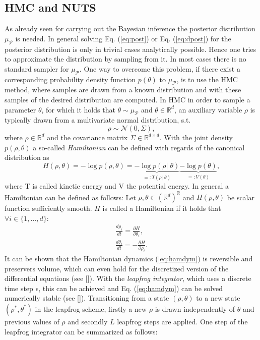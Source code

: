 \documentclass[12pt,letterpaper]{article}
\numberwithin{equation}{subsection}
\begin{document}
\subsection{HMC and NUTS}
As already seen for carrying out the Bayesian inference the posterior distribution $\mu_\mathcal{P}$ is needed. In general solving Eq.  (\ref{eq:post}) or Eq. (\ref{eq:dpost}) for the posterior distribution is only in trivial cases analytically possible. Hence one tries to approximate the distribution by sampling from it. In most cases there is no standard sampler for $\mu_\mathcal{P}$. One way to overcome this problem, if there exist a corresponding probability density function $p(\theta)$ to $\mu_\mathcal{P}$, is to use the HMC method, where samples are drawn from a known distribution and with these samples of the desired distribution are computed. In HMC in order to sample a parameter $\theta$, for which it holds that $\theta \sim \mu_\mathcal{P}$ and $\theta \in \mathbb{R}^d$, an auxiliary variable $\rho$ is typically drawn from a multivariate normal distribution, s.t.
\begin{equation}
\rho \sim \mathcal{N}(0,\Sigma), 
\end{equation}
where $\rho \in \mathbb{R}^d$ and the covariance matrix $\Sigma \in \mathbb{R}^{d \times d}$. With the joint density $p(\rho, \theta)$ a so-called \textit{Hamiltonian} can be defined with regards of the canonical distribution as
\begin{equation}
H(\rho, \theta) = -\log p(\rho, \theta) = \underbrace{-\log p(\rho |\; \theta)}_{=:T(\rho |\; \theta)} \underbrace{-\log p(\theta)}_{=:V(\theta)},
\end{equation}
where T is called kinetic energy and V the potential energy. In general a Hamiltonian can be defined as follows:
Let $\rho,\theta \in (\mathbb{R}^d)^\mathbb{R}$ and $H(\rho,\theta)$ be scalar function sufficiently smooth.
$H$ is called a Hamiltonian if it holds that $\forall i \in \{1,\dots,d\}:$
\begin{equation}
\label{eq:hamdym}
\begin{aligned}
\frac{d \rho_i }{dt} = \frac{\partial H}{\partial \theta_i}, \\
\frac{d \theta_i }{dt} = -\frac{\partial H}{\partial \rho_i}.
\end{aligned}
\end{equation}
It can be shown that the Hamiltonian dynamics (\ref{eq:hamdym}) is reversible and preservers volume, which can even hold for the discretized version of the differential equations (see [\cite{mcmchb}]). With the \textit{leapfrog integrator}, which uses a discrete time step $\epsilon$, this can be achieved and Eq. (\ref{eq:hamdym}) can be solved numerically stable (see [\cite{mcmchb}]). Transitioning from a state $(\rho, \theta)$ to a new state $(\rho^*,\theta^*)$ in the leapfrog scheme, firstly a new  $\rho$ is drawn independently of $\theta$ and previous values of $\rho$ and secondly $L$ leapfrog steps are applied. One step of the leapfrog integrator can be summarized as follows:
\end{document}
